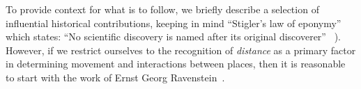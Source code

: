 
To provide context for what is to follow, we briefly describe a selection of influential historical contributions, keeping in mind ``Stigler's law of eponymy'' which states: ``No scientific discovery is named after its original discoverer''%
~\cite{stigler_1997_statistics}). However, if we restrict ourselves to the recognition of \emph{distance} as a primary factor in determining movement and interactions between places, then it is reasonable to start with the work of Ernst Georg Ravenstein~\cite{ravenstein_1885_laws}.\\


